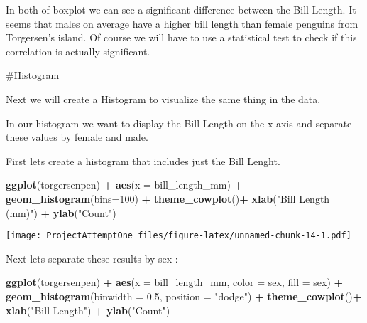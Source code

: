 \documentclass[
]{article}
\newenvironment{Shaded}{\begin{snugshade}}{\end{snugshade}}
\newcommand{\AttributeTok}[1]{\textcolor[rgb]{0.13,0.29,0.53}{#1}}
\newcommand{\DecValTok}[1]{\textcolor[rgb]{0.00,0.00,0.81}{#1}}
\newcommand{\FloatTok}[1]{\textcolor[rgb]{0.00,0.00,0.81}{#1}}
\newcommand{\FunctionTok}[1]{\textcolor[rgb]{0.13,0.29,0.53}{\textbf{#1}}}
\newcommand{\NormalTok}[1]{#1}
\newcommand{\SpecialCharTok}[1]{\textcolor[rgb]{0.81,0.36,0.00}{\textbf{#1}}}
\newcommand{\StringTok}[1]{\textcolor[rgb]{0.31,0.60,0.02}{#1}}
\begin{document}
In both of boxplot we can see a significant difference between the Bill
Length. It seems that males on average have a higher bill length than
female penguins from Torgersen's island. Of course we will have to use a
statistical test to check if this correlation is actually significant.

\#Histogram

Next we will create a Histogram to visualize the same thing in the data.

In our histogram we want to display the Bill Length on the x-axis and
separate these values by female and male.

First lets create a histogram that includes just the Bill Lenght.

\begin{Shaded}
\begin{Highlighting}[]
\FunctionTok{ggplot}\NormalTok{(torgersenpen) }\SpecialCharTok{+}
  \FunctionTok{aes}\NormalTok{(}\AttributeTok{x =}\NormalTok{ bill\_length\_mm) }\SpecialCharTok{+}
  \FunctionTok{geom\_histogram}\NormalTok{(}\AttributeTok{bins=}\DecValTok{100}\NormalTok{) }\SpecialCharTok{+}
  \FunctionTok{theme\_cowplot}\NormalTok{()}\SpecialCharTok{+}
  \FunctionTok{xlab}\NormalTok{(}\StringTok{"Bill Length (mm)"}\NormalTok{) }\SpecialCharTok{+} 
  \FunctionTok{ylab}\NormalTok{(}\StringTok{"Count"}\NormalTok{)}
\end{Highlighting}
\end{Shaded}

\texttt{[image: ProjectAttemptOne\_files/figure-latex/unnamed-chunk-14-1.pdf]}

Next lets separate these results by sex :

\begin{Shaded}
\begin{Highlighting}[]
\FunctionTok{ggplot}\NormalTok{(torgersenpen) }\SpecialCharTok{+}
  \FunctionTok{aes}\NormalTok{(}\AttributeTok{x =}\NormalTok{ bill\_length\_mm, }\AttributeTok{color =}\NormalTok{ sex, }\AttributeTok{fill =}\NormalTok{ sex) }\SpecialCharTok{+}
  \FunctionTok{geom\_histogram}\NormalTok{(}\AttributeTok{binwidth =} \FloatTok{0.5}\NormalTok{, }\AttributeTok{position =} \StringTok{"dodge"}\NormalTok{) }\SpecialCharTok{+}
  \FunctionTok{theme\_cowplot}\NormalTok{()}\SpecialCharTok{+}
    \FunctionTok{xlab}\NormalTok{(}\StringTok{"Bill Length"}\NormalTok{) }\SpecialCharTok{+} 
  \FunctionTok{ylab}\NormalTok{(}\StringTok{"Count"}\NormalTok{)}
\end{Highlighting}
\end{Shaded}
\end{document}
